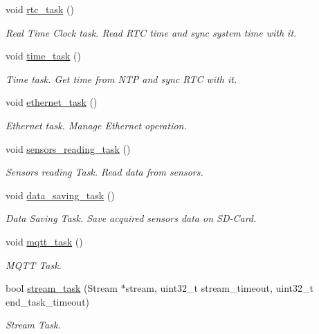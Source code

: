 \begin{DoxyCompactItemize}
void \hyperlink{rmap_8ino_a52f7fb7ebbd710f2a06b3f6e47c7e7e3}{rtc\+\_\+task} ()
\begin{DoxyCompactList}\small\item\em Real Time Clock task. Read R\+TC time and sync system time with it. \end{DoxyCompactList}\item 
void \hyperlink{rmap_8ino_a35c29025c5ef3d135b8c2b038be3f8df}{time\+\_\+task} ()
\begin{DoxyCompactList}\small\item\em Time task. Get time from N\+TP and sync R\+TC with it. \end{DoxyCompactList}\item 
void \hyperlink{rmap_8ino_abac8959915b759aa6429243ab9599ee3}{ethernet\+\_\+task} ()
\begin{DoxyCompactList}\small\item\em Ethernet task. Manage Ethernet operation. \end{DoxyCompactList}\item 
void \hyperlink{rmap_8ino_ad3efe51e17cb8205a24267c2992a12d4}{sensors\+\_\+reading\+\_\+task} ()
\begin{DoxyCompactList}\small\item\em Sensors reading Task. Read data from sensors. \end{DoxyCompactList}\item 
void \hyperlink{rmap_8ino_a1c6cee0cbd43bbe1215f13cab2434347}{data\+\_\+saving\+\_\+task} ()
\begin{DoxyCompactList}\small\item\em Data Saving Task. Save acquired sensors data on S\+D-\/\+Card. \end{DoxyCompactList}\item 
void \hyperlink{rmap_8ino_a161bca6629368a46242fec07a965966a}{mqtt\+\_\+task} ()
\begin{DoxyCompactList}\small\item\em M\+Q\+TT Task. \end{DoxyCompactList}\item 
bool \hyperlink{rmap_8ino_a21575354e8ec54fa31f581ed1838be79}{stream\+\_\+task} (Stream $\ast$stream, uint32\+\_\+t stream\+\_\+timeout, uint32\+\_\+t end\+\_\+task\+\_\+timeout)
\begin{DoxyCompactList}\small\item\em Stream Task. \end{DoxyCompactList}\end{DoxyCompactItemize}


